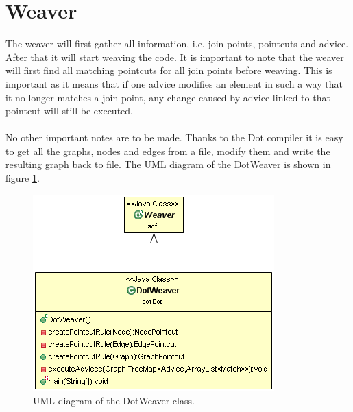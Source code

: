 \documentclass[a4paper]{report}
\begin{document}
\section{Weaver}
The weaver will first gather all information, i.e. join points, pointcuts and advice. After that it will start weaving the code. It is important to note that the weaver will first find all matching pointcuts for all join points before weaving. This is important as it means that if one advice modifies an element in such a way that it no longer matches a join point, any change caused by advice linked to that pointcut will still be executed.\\
\\
No other important notes are to be made. Thanks to the Dot compiler it is easy to get all the graphs, nodes and edges from a file, modify them and write the resulting graph back to file. The UML diagram of the DotWeaver is shown in figure \ref{fig:DotWeaver}.\\
\begin{figure}[h!]
\centering
\includegraphics[scale=0.7]{images/AOFDot/DotWeaver.png}
\caption{UML diagram of the DotWeaver class.}
\label{fig:DotWeaver}
\end{figure}
\end{document}
